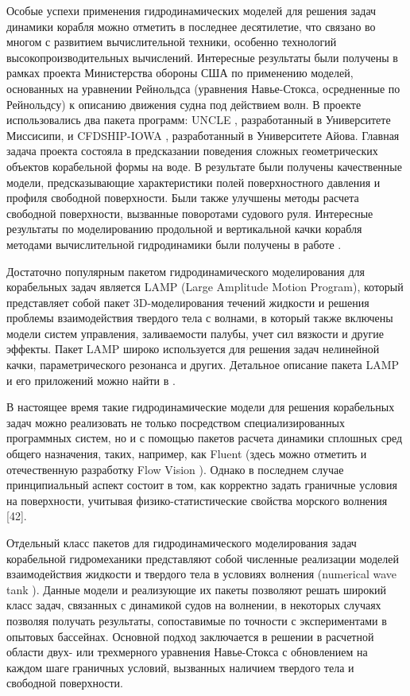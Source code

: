 Особые успехи применения гидродинамических моделей для решения задач динамики корабля можно отметить в последнее десятилетие, что связано во многом с развитием вычислительной техники, особенно технологий высокопроизводительных вычислений. Интересные результаты были получены в рамках проекта Министерства обороны США \citep{dk35} по применению моделей, основанных на уравнении Рейнольдса (уравнения Навье-Стокса, осредненные по Рейнольдсу) к описанию движения судна под действием волн. В проекте использовались два пакета программ: UNCLE \citep{dk36}, разработанный в Университете Миссисипи, и CFDSHIP-IOWA \citep{dk37}, разработанный в Университете Айова. Главная задача проекта состояла в предсказании поведения сложных геометрических объектов корабельной формы на воде. В результате были получены качественные модели, предсказывающие характеристики полей поверхностного давления и профиля свободной поверхности. Были также улучшены методы расчета свободной поверхности, вызванные поворотами судового руля. Интересные результаты по моделированию продольной и вертикальной качки корабля методами вычислительной гидродинамики были получены в работе \citep{dk38}.

Достаточно популярным пакетом гидродинамического моделирования для корабельных задач является LAMP (Large Amplitude Motion Program), который представляет собой пакет 3D-моделирования течений жидкости и решения проблемы взаимодействия твердого тела с волнами, в который также включены модели систем управления, заливаемости палубы, учет сил вязкости и другие эффекты. Пакет LAMP широко используется для решения задач нелинейной качки, параметрического резонанса и других. Детальное описание пакета LAMP и его приложений можно найти в \citep{dk39}\citep{dk40}. 

В настоящее время такие гидродинамические модели для решения корабельных задач можно реализовать не только посредством специализированных программных систем, но и с помощью пакетов расчета динамики сплошных сред общего назначения, таких, например, как Fluent (здесь можно отметить и отечественную разработку Flow Vision \citep{dk41}). Однако в последнем случае принципиальный аспект состоит в том, как корректно задать граничные условия на поверхности, учитывая физико-статистические свойства морского волнения [42].

Отдельный класс пакетов для гидродинамического моделирования задач корабельной гидромеханики представляют собой численные реализации моделей взаимодействия жидкости и твердого тела в условиях волнения (numerical wave tank \citep{dk41}\citep{dk42}\citep{dk43}\citep{dk44}). Данные модели и реализующие их пакеты позволяют решать широкий класс задач, связанных с динамикой судов на волнении, в некоторых случаях позволяя получать результаты, сопоставимые по точности с экспериментами в опытовых бассейнах. Основной подход заключается в решении в расчетной области двух- или трехмерного уравнения Навье-Стокса с обновлением на каждом шаге граничных условий, вызванных наличием твердого тела и свободной поверхности.

